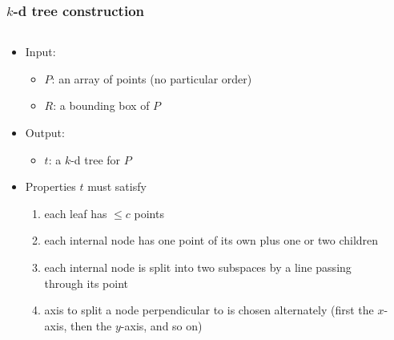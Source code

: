 \documentclass[12pt,dvipdfmx]{beamer}
\newcommand{\ao}[1]{{\color{blue}#1}}
\begin{document}
\begin{frame}
\frametitle{$k$-d tree construction}
\begin{columns}
\begin{column}{0.65\textwidth}
\begin{itemize}
\item Input: 
  \begin{itemize}
  \item \ao{$P$}: an array of points (no particular order)
  \item \ao{$R$}: a bounding box of $P$
  \end{itemize}
\item Output:
  \begin{itemize}
  \item \ao{$t$}: a $k$-d tree for $P$
  \end{itemize}
\item Properties $t$ must satisfy
  \begin{enumerate}
  \item<2-> each leaf has $\leq c$ points
  \item<3-> each internal node has one point of its own plus one or two children
  \item<3-> each internal node is split into two subspaces by a line passing through its point
  \item<4-> axis to split a node perpendicular to is chosen alternately
    (first the $x$-axis, then the $y$-axis, and so on)
  \end{enumerate}
\end{itemize}
\end{column}

\begin{column}{0.35\textwidth}
\def\svgwidth{0.6\textwidth}
\only<1>{}%

%

%
\only<4>{}%
%
\only<6>{}%
\end{column}
\end{columns}
\end{frame}
\end{document}
